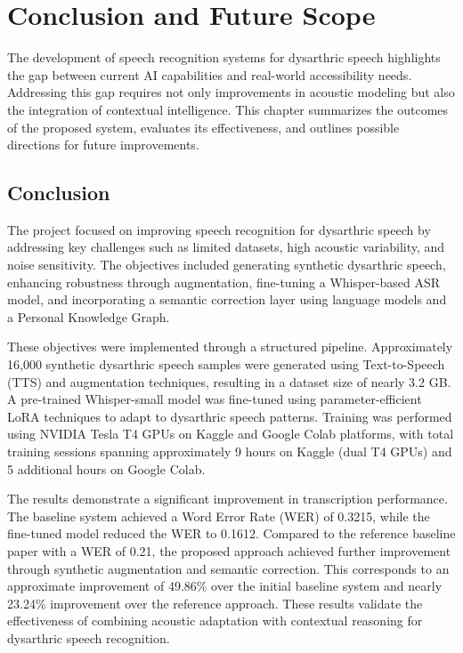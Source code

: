 \chapter{Conclusion and Future Scope}

The development of speech recognition systems for dysarthric speech highlights the gap between current AI capabilities and real-world accessibility needs. Addressing this gap requires not only improvements in acoustic modeling but also the integration of contextual intelligence. This chapter summarizes the outcomes of the proposed system, evaluates its effectiveness, and outlines possible directions for future improvements.

\section{Conclusion}

The project focused on improving speech recognition for dysarthric speech by addressing key challenges such as limited datasets, high acoustic variability, and noise sensitivity. The objectives included generating synthetic dysarthric speech, enhancing robustness through augmentation, fine-tuning a Whisper-based ASR model, and incorporating a semantic correction layer using language models and a Personal Knowledge Graph.

These objectives were implemented through a structured pipeline. Approximately 16,000 synthetic dysarthric speech samples were generated using Text-to-Speech (TTS) and augmentation techniques, resulting in a dataset size of nearly 3.2 GB. A pre-trained Whisper-small model was fine-tuned using parameter-efficient LoRA techniques to adapt to dysarthric speech patterns. Training was performed using NVIDIA Tesla T4 GPUs on Kaggle and Google Colab platforms, with total training sessions spanning approximately 9 hours on Kaggle (dual T4 GPUs) and 5 additional hours on Google Colab.

The results demonstrate a significant improvement in transcription performance. The baseline system achieved a Word Error Rate (WER) of 0.3215, while the fine-tuned model reduced the WER to 0.1612. Compared to the reference baseline paper with a WER of 0.21, the proposed approach achieved further improvement through synthetic augmentation and semantic correction. This corresponds to an approximate improvement of 49.86\% over the initial baseline system and nearly 23.24\% improvement over the reference approach. These results validate the effectiveness of combining acoustic adaptation with contextual reasoning for dysarthric speech recognition.

